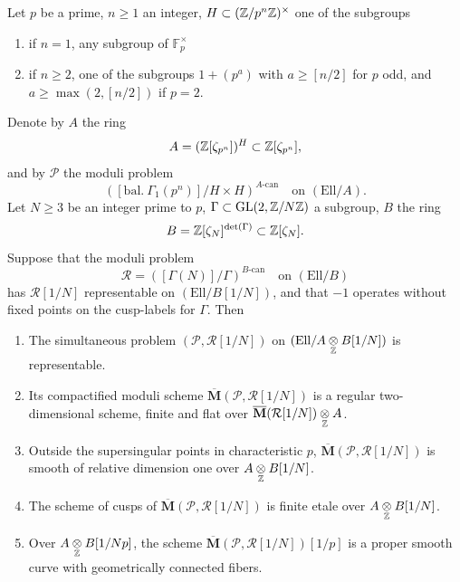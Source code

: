 \begin{kthm}\label{thm:10.12.2}
Let $p$ be a prime, $n \ge 1$ an integer, $H \subset (\mathbb{Z}/p^n\mathbb{Z})^\times$ one of the subgroups
\begin{enumerate}[label=(\arabic*)]
\item if $n = 1$, any subgroup of $\mathbb{F}_p^\times$
\item if $n \ge 2$, one of the subgroups $1 + (p^a)$ with $a \ge [n/2]$ for $p$ odd, and $a \ge \max(2, [n/2])$ if $p = 2$.
\end{enumerate}
Denote by $A$ the ring
\[
A = (\mathbb{Z}[\zeta_{p^n}])^H \subset \mathbb{Z}[\zeta_{p^n}] ,
\]
and by $\mathcal{P}$ the moduli problem
\[
([\mathrm{bal.}\ \Gamma_1(p^n)]/H \times H)^{A\text{-can}} \quad\text{on } (\mathrm{Ell}/A) .
\]
Let $N \ge 3$ be an integer prime to $p$, $\Gamma \subset \operatorname{GL}(2, \mathbb{Z}/N\mathbb{Z})$ a subgroup, $B$ the ring
\[
B = \mathbb{Z}[\zeta_N]^{\det(\Gamma)} \subset \mathbb{Z}[\zeta_N] .
\]
Suppose that the moduli problem
\[
\mathcal{R} = ([\Gamma(N)]/\Gamma)^{B\text{-can}} \quad\text{on } (\mathrm{Ell}/B)
\]
has $\mathcal{R}[1/N]$ representable on $(\mathrm{Ell}/B[1/N])$, and that $-1$ operates without fixed points on the cusp-labels for $\Gamma$. Then
\begin{enumerate}[label=(\arabic*)]
\item The simultaneous problem $(\mathcal{P}, \mathcal{R}[1/N])$ on $(\mathrm{Ell}/A \underset{\mathbb{Z}}{\otimes} B[1/N])$ is representable.
\item Its compactified moduli scheme $\overline{\mathbf{M}}(\mathcal{P}, \mathcal{R}[1/N])$ is a regular two-dimensional scheme, finite and flat over $\overline{\mathbf{M}}(\mathcal{R}[1/N]) \underset{\mathbb{Z}}{\otimes} A$.
\item Outside the supersingular points in characteristic $p$,\linebreak
$\overline{\mathbf{M}}(\mathcal{P}, \mathcal{R}[1/N])$ is smooth of relative dimension one over $A \underset{\mathbb{Z}}{\otimes} B[1/N]$.
\item The scheme of cusps of $\overline{\mathbf{M}}(\mathcal{P}, \mathcal{R}[1/N])$ is finite etale over $A \underset{\mathbb{Z}}{\otimes} B[1/N]$.
\item Over $A \underset{\mathbb{Z}}{\otimes} B[1/Np]$, the scheme $\overline{\mathbf{M}}(\mathcal{P}, \mathcal{R}[1/N])[1/p]$ is a proper smooth curve with geometrically connected fibers.
\end{enumerate}
\end{kthm}

